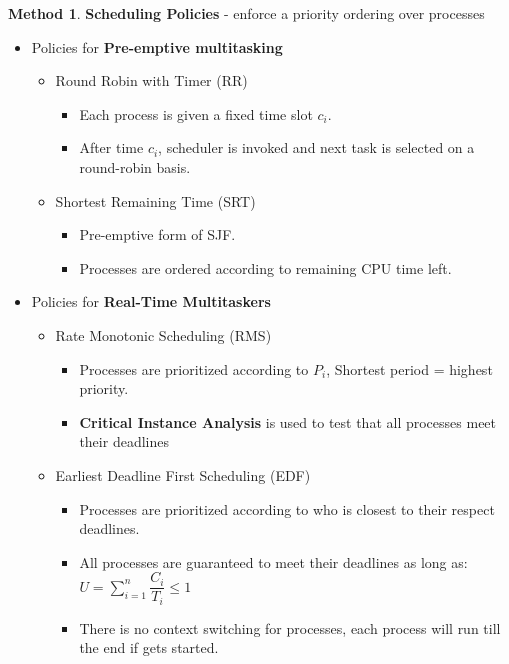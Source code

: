\documentclass[12pt,a4paper]{article}
\theoremstyle{definition}
\newtheorem{method}{Method}[section]
\newenvironment{myitemize}
{ \begin{itemize}
    \setlength{\itemsep}{5pt}
    \setlength{\parskip}{0pt}
    \setlength{\parsep}{0pt}     }
{ \end{itemize}                  }
\begin{document}
\begin{method}{\textbf{Scheduling Policies} - enforce a priority ordering over processes}
\begin{myitemize}
		\begin{myitemize}
			\item Round Robin with Voluntary Scheduling (\textsf{VS})
			\item \textbf{Voluntary Scheduling}: Processes call a special “yield” function. This invokes the scheduler. Causes the process to be suspended and another process started up.
		\end{myitemize}
		\item Policies for \textbf{Pre-emptive multitasking}
		\begin{myitemize}
			\item Round Robin with Timer (\textsf{RR})
			\begin{myitemize}
				\item Each process is given a fixed time slot $c_i$.
				\item After time $c_i$, scheduler is invoked and next task is selected on a round-robin basis.
			\end{myitemize}
			\item Shortest Remaining Time (\textsf{SRT})
			\begin{myitemize}
				\item Pre-emptive form of SJF.
				\item Processes are ordered according to remaining CPU time left.
			\end{myitemize}
		\end{myitemize}
		\item Policies for \textbf{Real-Time Multitaskers}
		\begin{myitemize}
			\item Rate Monotonic Scheduling (\textsf{RMS})
			\begin{myitemize}
				\item Processes are prioritized according to $P_i$, Shortest period = highest priority.
				\item \textbf{Critical Instance Analysis} is used to test that all processes meet their deadlines
			\end{myitemize}
			\item Earliest Deadline First Scheduling (\textsf{EDF})
			\begin{myitemize}
				\item Processes are prioritized according to who is closest to their respect deadlines.
				\item All processes are guaranteed to meet their deadlines as long as: $U=\sum^n_{i=1}\dfrac{C_i}{T_i} \leq 1$
				\item There is no context switching for processes, each process will run till the end if gets started.
			\end{myitemize}
		\end{myitemize}
	\end{myitemize}
\end{method}
\end{document}
